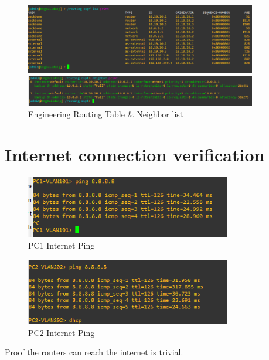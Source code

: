 \documentclass{article}
\begin{document}
		\begin{figure}[h!]
			\begin{minipage}{0.5\textwidth}
				\centering
				\includegraphics[width=0.9\textwidth]{eng_routing_table}
			\end{minipage}%
			\begin{minipage}{0.5\textwidth}
				\centering
				\includegraphics[width=0.9\textwidth]{eng_neighbors}
			\end{minipage}
			\caption{Engineering Routing Table \& Neighbor list}
		\end{figure}
	\section{Internet connection verification}
		\begin{figure}[h!]
			\centering
			\includegraphics[width=0.8\textwidth]{pc1_internet_ping}
			\caption{PC1 Internet Ping}
		\end{figure}
		\begin{figure}[h!]
			\centering
			\includegraphics[width=0.8\textwidth]{pc2_internet_ping}
			\caption{PC2 Internet Ping}
		\end{figure}
		Proof the routers can reach the internet is trivial.
		\newpage
\end{document}
